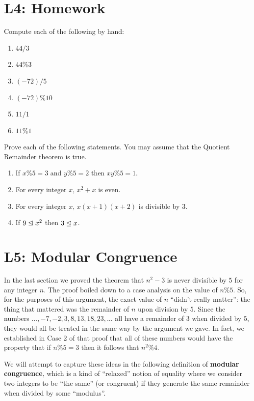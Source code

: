 \newpage

\section{L4: Homework}

\begin{xca}
	Compute each of the following by hand:
	\begin{enumerate}
		\item $44/3$
		\item $44\%3$
		\item $(-72)/5$
		\item $(-72)\%10$
		\item $11/1$
		\item $11 \%1$
		\end{enumerate}
	\end{xca}

\begin{xca}
Prove each of the following statements.  You may assume that the Quotient Remainder theorem is true.
	\begin{enumerate}
		\item If $x\%5 = 3$ and $y \%5 = 2$ then $xy \% 5 = 1$.
		\item For every integer $x$, $x^2 + x$ is even.
		\item For every integer $x$, $x(x+1)(x+2)$ is divisible by $3$.
		\item If $9 \trianglelefteq x^2$ then $3 \trianglelefteq x$.
	\end{enumerate}
\end{xca}
				
\section{L5: Modular Congruence}

In the last section we proved the theorem that $n^2 - 3$ is never divisible by $5$ for any integer $n$.  The proof boiled down to a case analysis on the value of $n \% 5$.  So, for the purposes of this argument, the exact value of $n$ ``didn't really matter'':  the thing that mattered was the remainder of $n$ upon division by $5$.  Since the numbers $..., -7, -2, 3, 8, 13, 18, 23, ...$  all  have a remainder of $3$ when divided by $5$, they would all be treated in the same way by the argument we gave.  In fact, we established in Case 2 of that proof that all of these numbers would have the property that if $n\%5 = 3$ then it follows that $n^2 \% 4$.

We will attempt to capture these ideas in the following definition of \textbf{modular congruence}, which is a kind of ``relaxed'' notion of equality where we consider two integers to be ``the same'' (or congruent) if they generate the same remainder when divided by some ``modulus''.

